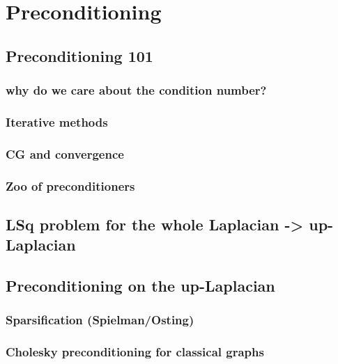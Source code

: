 \chapter{Preconditioning}


\section{Preconditioning 101}

\subsection{ why do we care about the condition number?}


\subsection{ Iterative methods }


\subsection{ CG and convergence  }


\subsection{ Zoo of preconditioners }




\section{ LSq problem for the whole Laplacian -> up-Laplacian }
      
\section{ Preconditioning on the up-Laplacian }
      
\subsection{ Sparsification (Spielman/Osting) }
      
\subsection{ Cholesky preconditioning for classical graphs  }


